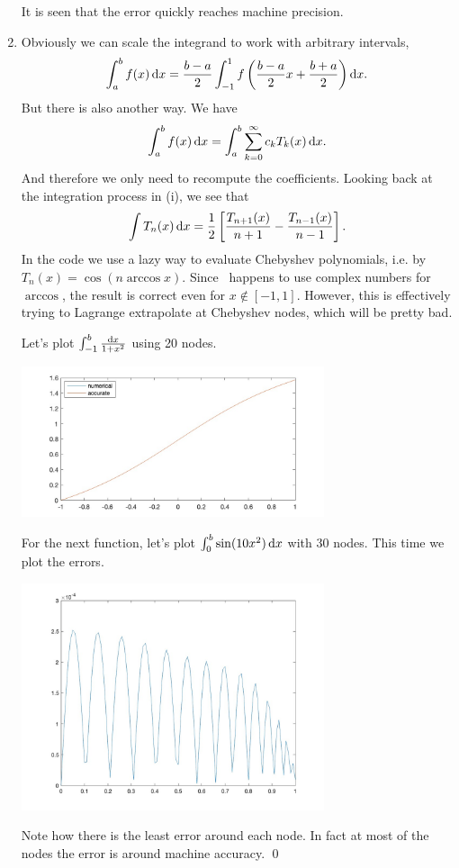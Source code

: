 \documentclass{homework}
\begin{document}
\begin{problem}
\begin{enumerate}[label=(\roman*)]
\begin{center}
\end{center}
It is seen that the error quickly reaches machine precision.
\item Obviously we can scale the integrand to work with arbitrary intervals,
\[\int_a^b f(x) \d[x] = \frac{b-a}{2}\int_{-1}^1 f\left(\frac{b-a}{2}x + \frac{b+a}{2}\right) \d[x].\]
But there is also another way. We have
\[\int_a^b f(x) \d[x] = \int_a^b \sum_{k=0}^\infty c_k T_k(x) \d[x].\]
And therefore we only need to recompute the coefficients. Looking back at the integration process in (i), we see that
\[\int T_n(x) \d[x] = \frac12\left[\frac{T_{n+1}(x)}{n+1} - \frac{T_{n-1}(x)}{n-1}\right].\]
In the code we use a lazy way to evaluate Chebyshev polynomials, i.e. by \(T_n(x) = \cos(n\arccos x)\). Since \Matlab\ happens to use complex numbers for \(\arccos\), the result is correct even for \(x \notin [-1,1]\). However, this is effectively trying to Lagrange extrapolate at Chebyshev nodes, which will be pretty bad.

Let's plot \(\int_{-1}^b \frac{\d[x]}{1+x^2}\) using 20 nodes.
\begin{center}
\includegraphics[width=0.7\textwidth]{Hw5-Fig2-1.jpg}
\end{center}

For the next function, let's plot \(\int_{0}^b \sin(10x^2) \d[x]\) with 30 nodes. This time we plot the errors.
\begin{center}
\includegraphics[width=0.7\textwidth]{Hw5-Fig2-2.jpg}
\end{center}
Note how there is the least error around each node. In fact at most of the nodes the error is around machine accuracy. \qed
\end{enumerate}
\renewcommand{\qedsymbol}{}
\end{problem}
\end{document}

